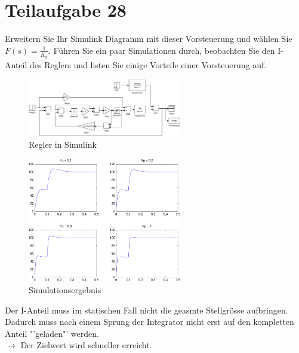 \section{Teilaufgabe 28}
\begin{aufgabe}
    Erweitern Sie Ihr Simulink Diagramm mit dieser Vorsteuerung und wählen Sie 
    $F(s) = \frac{1}{K_g}$. Führen Sie ein paar Simulationen durch, beobachten 
    Sie den I-Anteil des Reglers und listen Sie einige Vorteile einer 
    Vorsteuerung auf.
\end{aufgabe}
\begin{figure}[h!]
    \centering
    \includegraphics[width=0.6\textwidth]{28/regler_feedforward.pdf}
    \caption{Regler in Simulink}
    \label{fig:28}
\end{figure}
\begin{figure}[h!]
    \centering
    \includegraphics[width=0.6\textwidth]{28/regler_feedforward_plot.pdf}
    \caption{Simulationsergebnis}
    \label{fig:28plot}
\end{figure}

Der I-Anteil muss im statischen Fall nicht die geasmte Stellgrösse aufbringen. 
Dadurch muss nach einem Sprung der Integrator nicht erst auf den kompletten 
Anteil "'geladen"' werden. \\
$\to$ Der Zielwert wird schneller erreicht. 

